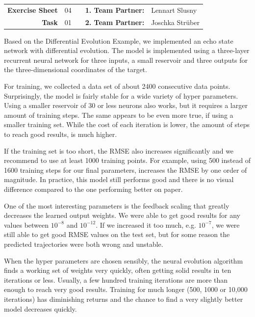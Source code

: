 
\newcommand{\obenlinks}{Recurrent and Generative Artificial Neural Networks}

\begin{center}
	\begin{tabular}{|rlp{4cm}rl|}
	\hline
	 \textbf{Exercise Sheet} & 04  &  & \textbf{1. Team Partner:} & Lennart Slusny  \\
	 \textbf{Task} & 01 & & \textbf{2. Team Partner:} & Joschka Strüber \\ \hline
	\end{tabular}
\end{center} 

Based on the Differential Evolution Example, we implemented an echo state network with differential evolution. The model is implemented using a three-layer recurrent neural network for three inputs, a small reservoir and three outputs for the three-dimensional coordinates of the target.  

For training, we collected a data set of about 2400 consecutive data points. Surprisingly, the model is fairly stable for a wide variety of hyper parameters. Using a smaller reservoir of 30 or less neurons also works, but it requires a larger amount of training steps. The same appears to be even more true, if using a smaller training set. While the cost of each iteration is lower, the amount of steps to reach good results, is much higher. 

If the training set is too short, the RMSE also increases significantly and we recommend to use at least 1000 training points. For example, using 500 instead of 1600 training steps for our final parameters, increases the RMSE by one order of magnitude. In practice, this model still performs good and there is no visual difference compared to the one performing better on paper. 

One of the most interesting parameters is the feedback scaling that greatly decreases the learned output weights. We were able to get good results for any values between $10^{-8}$ and $10^{-12}$. If we increased it too much, e.g. $10^{-7}$, we were still able to get good RMSE values on the test set, but for some reason the predicted trajectories were both wrong and unstable.

When the hyper parameters are chosen sensibly, the neural evolution algorithm finds a working set of weights very quickly, often getting solid results in ten iterations or less. Usually, a few hundred training iterations are more than enough to reach very good results. Training for much longer (500, 1000 or 10,000 iterations) has diminishing returns and the chance to find a very slightly better model decreases quickly.

